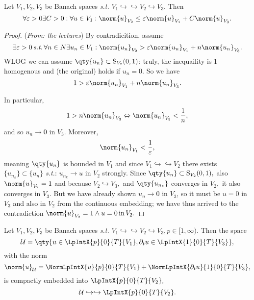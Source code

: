 \begin{lemma}[Ehrling]
	Let $V_1, V_2, V_3$ be Banach spaces \textit{s.t.} $V_1 \hookrightarrow \hookrightarrow V_2 \hookrightarrow V_3.$ Then
	\[
		\forall \varepsilon >0 \exists C>0: \forall u \in V_1: \norm{u}_{V_2} \leq \varepsilon \norm{u}_{V_1}+C \norm{u}_{V_3}.
	\]
\end{lemma}

\begin{proof}(\textit{From: the lectures})
	By contradicition, assume
	\[
		\exists \varepsilon >0 \, \text{\textit{s.t.}} \, \forall n \in N \exists u_n \in V_1: \norm{u_n}_{V_2} > \varepsilon \norm{u_n}_{V_1}+n \norm{u_n}_{V_3}.
	\]
	WLOG we can assume $\qty{u_n} \subset \text{S}_{V_2}(0,1)$: truly, the inequaility is 1-homogenous and (the original) holds if $u_n = 0.$
	So we have
	\[
		1 > \varepsilon \norm{u_n}_{V_1} + n \norm{u_n}_{V_3}.
	\]

	In particular,
	\[
		1 > n \norm{u_n}_{V_3} \Leftrightarrow \norm{u_n}_{V_3} < \frac{1}{n},
	\]
	and so $u_n \to 0$ in $V_3.$ Moreover, 
	\[
		\norm{u_n}_{V_1} < \frac{1}{\varepsilon},
	\]
	meaning $\qty{u_n}$ is bounded in $V_1$ and since $V_1 \hookrightarrow \hookrightarrow V_2$ there exists $\{u_{n_k}\} \subset \{u_n\}$ \textit{s.t.}: $u_{n_k} \to u$ in $V_2$ strongly. Since $\qty{u_n} \subset \text{S}_{V_2}(0,1),$ also $\norm{u}_{V_2} = 1$ and because $V_2 \hookrightarrow V_3,$ and $\qty{u_{n_k}}$ converges in $V_2,$ it also converges in $V_3.$ But we have already shown $u_n \to 0$ in $V_3$, so it must be $u = 0$ in $V_3$ and also in $V_2$ from the continuous embedding; we have thus arrived to the contradiction $\norm{u}_{V_2} = 1 \wedge u = 0 \, \text{in} \, V_2.$
\end{proof}
\begin{theorem}
	Let $V_1, V_2, V_3$ be Banach spaces \textit{s.t.} $V_1 \hookrightarrow \hookrightarrow V_2 \hookrightarrow V_3, p \in [1, \infty).$ Then the space
	\[
		\mathcal{U} = \qty{u\in \LpIntX{p}{0}{T}{V_1},  \partial_t u \in \LpIntX{1}{0}{T}{V_3}},
	\]
	with the norm
	\[
		\norm{u}_{\mathcal{U}} = \NormLpIntX{u}{p}{0}{T}{V_1}+ \NormLpIntX{\partial_t u}{1}{0}{T}{V_3},
	\]
	is compactly embedded into $\LpIntX{p}{0}{T}{V_2},$
	\[
		\mathcal{U} \hookrightarrow \hookrightarrow \LpIntX{p}{0}{T}{V_2}.
	\]
\end{theorem}
